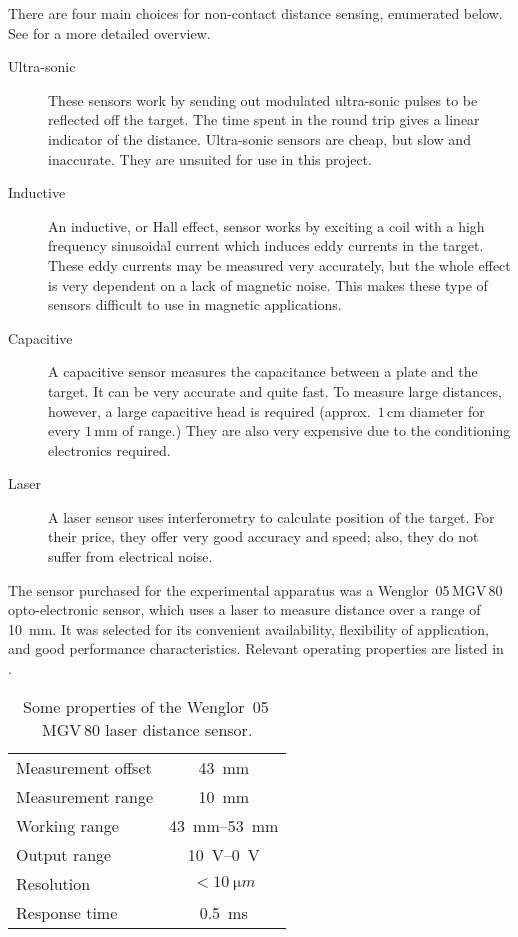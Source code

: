 There are four main choices for non-contact distance sensing,
enumerated below. See \textcite{boehm1993} for a more detailed overview.
\begin{description}
\item[Ultra-sonic] 
    These sensors work by sending out modulated
    ultra-sonic pulses to be reflected off the target. The time spent
    in the round trip gives a linear indicator of the
    distance. Ultra-sonic sensors are cheap, but slow and
    inaccurate. They are unsuited for use in this project.
\item[Inductive] 
    An inductive, or Hall effect, sensor works by
    exciting a coil with a high frequency sinusoidal current which
    induces eddy currents in the target.  These eddy currents may be
    measured very accurately, but the whole effect is very dependent
    on a lack of magnetic noise. This makes these type of sensors
    difficult to use in magnetic applications.
\item[Capacitive] 
    A capacitive sensor measures the capacitance
    between a plate and the target.  It can be very accurate and quite
    fast. To measure large distances, however, a large capacitive head
    is required (approx.\ $1$\,cm diameter for every $1$\,mm of
    range.) They are also very expensive due to the conditioning
    electronics required.
\item[Laser] 
    A laser sensor uses interferometry to calculate position
    of the target. For their price, they offer very good accuracy and
    speed; also, they do not suffer from electrical noise.
\end{description}

The sensor purchased for the experimental apparatus was a Wenglor~05\,MGV\,80
opto-electronic sensor, which uses a laser to measure distance over a
range of \SI{10}{mm}. It was selected for its convenient availability,
flexibility of application, and good performance characteristics.
Relevant operating properties are listed in .

\begin{table}
  \caption{Some properties of the Wenglor~05\,MGV\,80 laser distance sensor.}
  \begin{tabular}{@{}lc@{}}
    \toprule
    Measurement offset & \SI{43}{mm} \\
    Measurement range & \SI{10}{mm} \\
    \midrule
    Working range & \SI{43}{mm}--\SI{53}{mm} \\
    Output range & \SI{10}{V}--\SI{0}{V} \\
    \midrule
    Resolution & $<\SI{10}{\micro m}$ \\
    Response time & \SI{0.5}{ms} \\
    \bottomrule
  \end{tabular}
\end{table}


